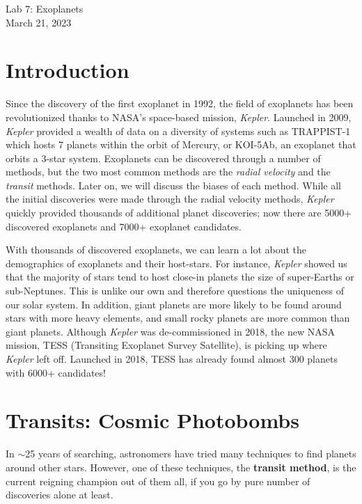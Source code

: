 \documentclass[11pt]{article}
\begin{document}
\begin{center}
\huge{Lab 7: Exoplanets}\\ \medskip \Large{March 21, 2023}
\end{center}

\section{Introduction}

Since the discovery of the first exoplanet in 1992, the field of exoplanets has been revolutionized thanks to NASA's space-based mission, \textit{Kepler}. Launched in 2009, \textit{Kepler} provided a wealth of data on a diversity of systems such as TRAPPIST-1 which hosts 7 planets within the orbit of Mercury, or KOI-5Ab, an exoplanet that orbits a 3-star system. Exoplanets can be discovered through a number of methods, but the two most common methods are the \textit{radial velocity} and the \textit{transit} methods. Later on, we will discuss the biases of each method. While all the initial discoveries were made through the radial velocity methods, \textit{Kepler} quickly provided thousands of additional planet discoveries; now there are 5000+ discovered exoplanets and 7000+ exoplanet candidates. 

\medskip \noindent
With thousands of discovered exoplanets, we can learn a lot about the demographics of exoplanets and their host-stars. For instance, \textit{Kepler} showed us that the majority of stars tend to host close-in planets the size of super-Earths or sub-Neptunes. This is unlike our own and therefore questions the uniqueness of our solar system. In addition, giant planets are more likely to be found around stars with more heavy elements, and small rocky planets are more common than giant planets.  Although \textit{Kepler} was de-commissioned in 2018, the new NASA mission, TESS (Transiting Exoplanet Survey Satellite), is picking up where \textit{Kepler} left off. Launched in 2018, TESS has already found almost 300 planets with 6000+ candidates!


\section{Transits: Cosmic Photobombs}

In $\sim$25 years of searching, astronomers have tried many techniques to find planets around other stars. However, one of these techniques, the \textbf{transit method}, is the current reigning champion out of them all, if you go by pure number of discoveries alone at least.
\end{document}

